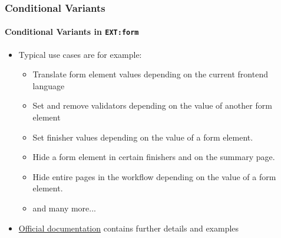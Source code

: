 \begin{frame}[fragile]
	\frametitle{Conditional Variants}
	\framesubtitle{Conditional Variants in \texttt{EXT:form}}

	\begin{itemize}
		\item Typical use cases are for example:

			\begin{itemize}
				\item Translate form element values depending on the current
					frontend language
				\item Set and remove validators depending on the value of
					another form element
				\item Set finisher values depending on the value of a form element.
				\item Hide a form element in certain finishers and on the summary page.
				\item Hide entire pages in the workflow depending on the value of a
					form element.
				\item and many more...
			\end{itemize}

		\item \href{https://docs.typo3.org/typo3cms/extensions/form}{Official documentation}
			contains further details and examples

	\end{itemize}

\end{frame}

